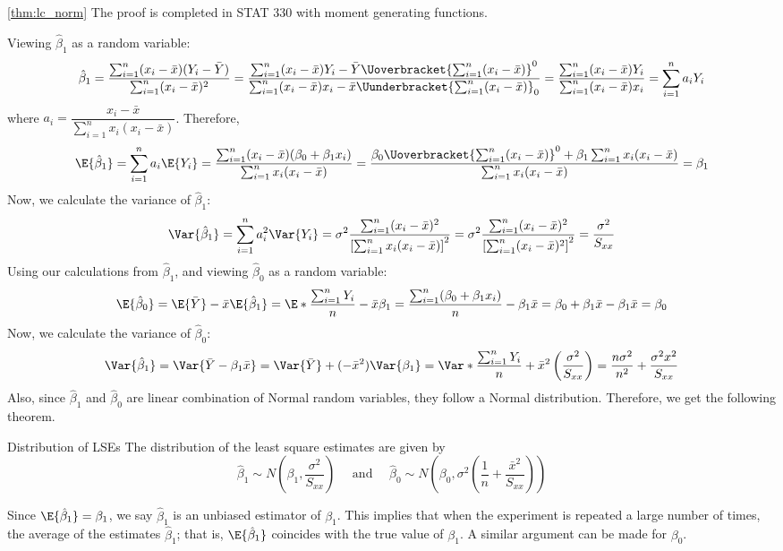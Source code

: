 \begin{Proof}{\ref{thm:lc_norm}}{}
    The proof is completed in STAT 330 with moment generating functions.
\end{Proof}
Viewing $ \hat{\beta}_1 $ as a random variable:
\[ \hat{\beta}_1=\frac{\sum_{i=1}^{n} (x_i-\bar{x})
        (Y_i-\bar{Y})}{
        \sum_{i=1}^{n} (x_i-\bar{x})^2
    }
    =
    \frac{\sum_{i=1}^{n} (x_i-\bar{x})Y_i-
        \bar{Y}\Uoverbracket{\sum_{i=1}^{n} (x_i-\bar{x})}^{0}}{
        \sum_{i=1}^{n} (x_i-\bar{x})x_i-\bar{x}
        \Uunderbracket{\sum_{i=1}^{n} (x_i-\bar{x})}_{0}
    }
    =
    \frac{\sum_{i=1}^{n} (x_i-\bar{x})Y_i}{
        \sum_{i=1}^{n} (x_i-\bar{x})x_i
    }=\sum_{i=1}^{n} a_i Y_i  \]
where $ a_i=\dfrac{x_i-\bar{x}}{\sum_{i=1}^{n} x_i(x_i-\bar{x})}  $.
Therefore,
\[
    \E{\hat{\beta}_1}
    = \sum_{i=1}^{n} a_i\E{Y_i}
    =\frac{\sum_{i=1}^{n}(x_i-\bar{x})(\beta_0+\beta_1x_i)}{
        \sum_{i=1}^{n} x_i(x_i-\bar{x})
    }
    =\frac{\beta_0 \Uoverbracket{\sum_{i=1}^{n}(x_i-\bar{x})}^{0}+
        \beta_1\sum_{i=1}^{n} x_i(x_i-\bar{x})}{
        \sum_{i=1}^{n} x_i(x_i-\bar{x})
    }
    =
    \beta_1
\]
Now, we calculate the variance of $ \hat{\beta}_1 $:
\[
    \Var{\hat{\beta}_1}
    =\sum_{i=1}^{n} a_i^2\Var{Y_i}
    =\sigma^2
    \frac{\sum_{i=1}^{n} (x_i-\bar{x})^2}{
        \left[ \sum_{i=1}^{n} x_i(x_i-\bar{x}) \right]^2
    }
    =\sigma^2 \frac{\sum_{i=1}^{n} (x_i-\bar{x})^2}{
        \left[ \sum_{i=1}^{n} (x_i-\bar{x})^2 \right]^2
    }
    =\frac{\sigma^2}{S_{xx}}
\]
Using our calculations from $ \hat{\beta}_1 $,
and viewing $ \hat{\beta}_0 $ as a random variable:
\[ \E{\hat{\beta}_0}=
    \E{\bar{Y}}-\bar{x}\E{\hat{\beta}_1}=
    \E*{\frac{\sum_{i=1}^{n}Y_i}{n}}-\bar{x}\beta_1=
    \frac{\sum_{i=1}^{n}(\beta_0+\beta_1x_i)}{n}-
    \beta_1\bar{x}=\beta_0+\beta_1\bar{x}-\beta_1\bar{x}=\beta_0
\]
Now, we calculate the variance of $ \hat{\beta}_0 $:
\[
    \Var{\hat{\beta}_1}
    =\Var{\bar{Y}-\beta_1\bar{x}}
    =\Var{\bar{Y}}+(-\bar{x}^2)\Var{\beta_1}
    =\Var*{\frac{\sum_{i=1}^{n} Y_i}{n}}+\bar{x}^2\left( \frac{\sigma^2}{S_{xx}} \right)
    =\frac{n\sigma^2}{n^2}+\frac{\sigma^2 x^2}{S_{xx}}
\]
Also, since $ \hat{\beta}_1 $ and $ \hat{\beta}_0 $
are linear combination of Normal random variables,
they follow a Normal distribution. Therefore, we get the following theorem.
\begin{Theorem}{Distribution of LSEs}{}
    The distribution of the least square estimates are given by
    \[ \hat{\beta}_1\sim
        N\left( \beta_1,\frac{\sigma^2}{S_{xx}}  \right)\quad\text{ and }\quad
        \hat{\beta}_0
        \sim N\left( \beta_0,\sigma^2
        \left(\frac{1}{n}+\frac{\bar{x}^2}{S_{xx}}\right)  \right) \]
\end{Theorem}
Since $ \E{\hat{\beta}_1}=\beta_1 $,
we say $ \hat{\beta}_1 $ is an unbiased
estimator of $ \beta_1 $. This implies
that when the experiment is repeated a large
number of times, the average
of the estimates $ \hat{\beta}_1 $; that is,
$ \E{\hat{\beta}_1} $ coincides with the true
value of $ \beta_1 $. A similar argument can be made for $ \beta_0 $.

